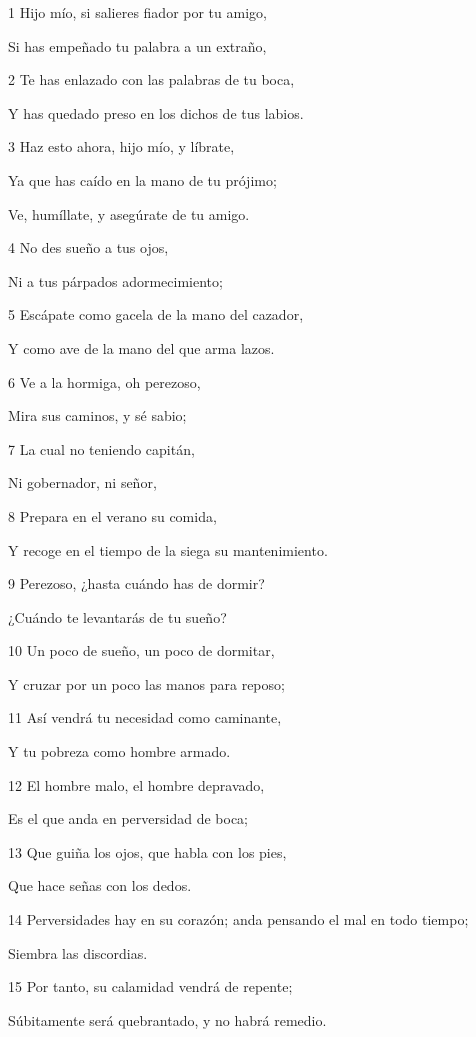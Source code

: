 \par 1 Hijo mío, si salieres fiador por tu amigo,
\par Si has empeñado tu palabra a un extraño,
\par 2 Te has enlazado con las palabras de tu boca,
\par Y has quedado preso en los dichos de tus labios.
\par 3 Haz esto ahora, hijo mío, y líbrate,
\par Ya que has caído en la mano de tu prójimo;
\par Ve, humíllate, y asegúrate de tu amigo.
\par 4 No des sueño a tus ojos,
\par Ni a tus párpados adormecimiento;
\par 5 Escápate como gacela de la mano del cazador,
\par Y como ave de la mano del que arma lazos.
\par 6 Ve a la hormiga, oh perezoso,
\par Mira sus caminos, y sé sabio;
\par 7 La cual no teniendo capitán,
\par Ni gobernador, ni señor,
\par 8 Prepara en el verano su comida,
\par Y recoge en el tiempo de la siega su mantenimiento.
\par 9 Perezoso, ¿hasta cuándo has de dormir?
\par ¿Cuándo te levantarás de tu sueño?
\par 10 Un poco de sueño, un poco de dormitar, 
\par Y cruzar por un poco las manos para reposo;
\par 11 Así vendrá tu necesidad como caminante,
\par Y tu pobreza como hombre armado. 
\par 12 El hombre malo, el hombre depravado,
\par Es el que anda en perversidad de boca;
\par 13 Que guiña los ojos, que habla con los pies,
\par Que hace señas con los dedos.
\par 14 Perversidades hay en su corazón; anda pensando el mal en todo tiempo;
\par Siembra las discordias.
\par 15 Por tanto, su calamidad vendrá de repente;
\par Súbitamente será quebrantado, y no habrá remedio.
